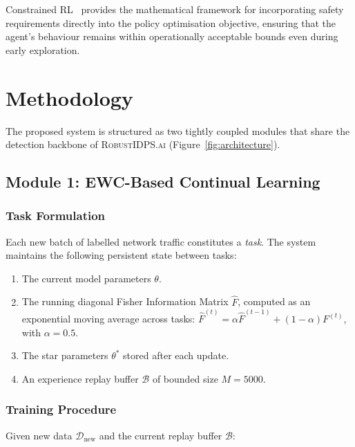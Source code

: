 \documentclass[12pt,a4paper]{article}
\newcommand{\RobustIDPS}{\textsc{RobustIDPS.ai}}
\theoremstyle{definition}
\begin{document}
Constrained RL~\cite{altman1999} provides the mathematical framework for incorporating safety requirements directly into the policy optimisation objective, ensuring that the agent's behaviour remains within operationally acceptable bounds even during early exploration.


\section{Methodology}
\label{sec:methodology}

The proposed system is structured as two tightly coupled modules that share the detection backbone of \RobustIDPS{} (Figure~\ref{fig:architecture}).

\subsection{Module 1: EWC-Based Continual Learning}

\subsubsection{Task Formulation}

Each new batch of labelled network traffic constitutes a \emph{task}.
The system maintains the following persistent state between tasks:

\begin{enumerate}
\item The current model parameters $\theta$.
\item The running diagonal Fisher Information Matrix $\hat{F}$, computed as an exponential moving average across tasks: $\hat{F}^{(t)} = \alpha \hat{F}^{(t-1)} + (1 - \alpha) F^{(t)}$, with $\alpha = 0.5$.
\item The star parameters $\theta^{*}$ stored after each update.
\item An experience replay buffer $\mathcal{B}$ of bounded size $M = 5000$.
\end{enumerate}

\subsubsection{Training Procedure}

Given new data $\mathcal{D}_{\text{new}}$ and the current replay buffer $\mathcal{B}$:
\end{document}
